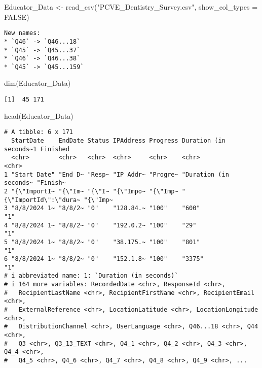\documentclass[
  11pt,
  letterpaper,
  DIV=11,
  numbers=noendperiod]{scrartcl}
\newenvironment{Shaded}{\begin{snugshade}}{\end{snugshade}}
\newcommand{\AttributeTok}[1]{\textcolor[rgb]{0.40,0.45,0.13}{#1}}
\newcommand{\ConstantTok}[1]{\textcolor[rgb]{0.56,0.35,0.01}{#1}}
\newcommand{\FunctionTok}[1]{\textcolor[rgb]{0.28,0.35,0.67}{#1}}
\newcommand{\NormalTok}[1]{\textcolor[rgb]{0.00,0.23,0.31}{#1}}
\newcommand{\OtherTok}[1]{\textcolor[rgb]{0.00,0.23,0.31}{#1}}
\newcommand{\StringTok}[1]{\textcolor[rgb]{0.13,0.47,0.30}{#1}}
\begin{document}
\begin{Shaded}
\begin{Highlighting}[]
\NormalTok{Educator\_Data }\OtherTok{\textless{}{-}} \FunctionTok{read\_csv}\NormalTok{(}\StringTok{"PCVE\_Dentistry\_Survey.csv"}\NormalTok{, }\AttributeTok{show\_col\_types =} \ConstantTok{FALSE}\NormalTok{)}
\end{Highlighting}
\end{Shaded}

\begin{verbatim}
New names:
* `Q46` -> `Q46...18`
* `Q45` -> `Q45...37`
* `Q46` -> `Q46...38`
* `Q45` -> `Q45...159`
\end{verbatim}

\begin{Shaded}
\begin{Highlighting}[]
\FunctionTok{dim}\NormalTok{(Educator\_Data)}
\end{Highlighting}
\end{Shaded}

\begin{verbatim}
[1]  45 171
\end{verbatim}

\begin{Shaded}
\begin{Highlighting}[]
\FunctionTok{head}\NormalTok{(Educator\_Data)}
\end{Highlighting}
\end{Shaded}

\begin{verbatim}
# A tibble: 6 x 171
  StartDate    EndDate Status IPAddress Progress Duration (in seconds~1 Finished
  <chr>        <chr>   <chr>  <chr>     <chr>    <chr>                  <chr>   
1 "Start Date" "End D~ "Resp~ "IP Addr~ "Progre~ "Duration (in seconds~ "Finish~
2 "{\"ImportI~ "{\"Im~ "{\"I~ "{\"Impo~ "{\"Imp~ "{\"ImportId\":\"dura~ "{\"Imp~
3 "8/8/2024 1~ "8/8/2~ "0"    "128.84.~ "100"    "600"                  "1"     
4 "8/8/2024 1~ "8/8/2~ "0"    "192.0.2~ "100"    "29"                   "1"     
5 "8/8/2024 1~ "8/8/2~ "0"    "38.175.~ "100"    "801"                  "1"     
6 "8/8/2024 1~ "8/8/2~ "0"    "152.1.8~ "100"    "3375"                 "1"     
# i abbreviated name: 1: `Duration (in seconds)`
# i 164 more variables: RecordedDate <chr>, ResponseId <chr>,
#   RecipientLastName <chr>, RecipientFirstName <chr>, RecipientEmail <chr>,
#   ExternalReference <chr>, LocationLatitude <chr>, LocationLongitude <chr>,
#   DistributionChannel <chr>, UserLanguage <chr>, Q46...18 <chr>, Q44 <chr>,
#   Q3 <chr>, Q3_13_TEXT <chr>, Q4_1 <chr>, Q4_2 <chr>, Q4_3 <chr>, Q4_4 <chr>,
#   Q4_5 <chr>, Q4_6 <chr>, Q4_7 <chr>, Q4_8 <chr>, Q4_9 <chr>, ...
\end{verbatim}
\end{document}
